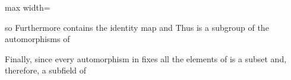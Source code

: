\documentclass[11pt,oneside]{article}
\begin{document}
\begin{BookBody}
\begin{center}\begin{adjustbox}{max width=\linewidth}\end{adjustbox}\end{center}

\noindent so  Furthermore contains the identity map and  Thus  is a subgroup of the automorphisms of 

Finally, since every automorphism in  fixes all the elements of  is a subset and, therefore, a subfield of \BookEnd{\blacklozenge}

\end{BookBody}

\BookNarrativetrue
\end{document}
